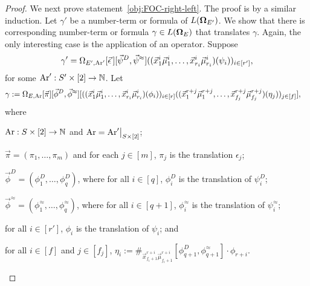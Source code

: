 \documentclass[../main/thesis.tex]{subfiles}
\begin{document}
\begin{proof}



  

  We next prove statement~\ref{obj:FOC-right-left}. The proof is by a similar
  induction. Let $\gamma'$ be a number-term or formula of $L(\mathbf{\mathbf{\Omega}}_{E'})$. We
  show that there is corresponding number-term or formula $\gamma \in
  L(\mathbf{\mathbf{\Omega}}_{E})$ that translates $\gamma$. Again, the only interesting case is
  the application of an operator. Suppose
  \begin{align*}
    \gamma' = \Omega_{E', \text{\upshape Ar}'}[\vec{\epsilon}\,][\vec{\psi}^D, \vec{\psi}^{\approx}] ((\vec{x}^i_1 \vec{\mu}^i_1, \ldots, \vec{x}^i_{r_i} \vec{\mu}^i_{r_i})(\psi_i))_{i \in [r']},
  \end{align*}
  for some $\text{\upshape Ar}' : S' \times [2] \rightarrow \mathbb{N}$. Let
  \begin{align*}
    \gamma := \Omega_{E, \text{\upshape Ar}} [\vec{\pi}] [\vec{\phi}^D, \vec{\phi}^{\approx}]  [((\vec{x}^i_1 \vec{\mu}^i_1, \ldots, \vec{x}^i_{r_i} \vec{\mu}^i_{r_i})(\phi_i))_{i \in [r]}&((\vec{x}^{r + j}_1 \vec{\mu}^{r + j}_1, \ldots, \vec{x}^{r + j}_{f_j} \vec{\mu}^{r+j}_{f_j})(\eta_j))_{j \in [f]}],
  \end{align*}
  where
  \begin{myitemize}
  \item $\text{\upshape Ar} : S \times [2] \rightarrow \mathbb{N}$ and $\ar = \restr{\ar'}{S \times [2]}$;
  \item $\vec{\pi} = (\pi_1, \ldots, \pi_m)$ and for each $j \in [m]$, $\pi_j$
    is the translation $\epsilon_j$;
  \item $\vec{\phi}^D = (\phi^D_1, \ldots, \phi^D_{q})$, where for all $i \in
    [q]$, $\phi^D_i$ is the translation of $\psi^D_i$;
  \item $\vec{\phi}^{\approx} = (\phi^{\approx}_1, \ldots, \phi^{\approx}_q)$,
    where for all $i \in [q+1]$, $\phi^{\approx}_i$ is the translation of
    $\psi^\approx_i$;
  \item for all $i \in [r']$, $\phi_i$ is the translation of $\psi_i$; and
  \item for all $i \in [f]$ and $j \in [f_j]$, $\eta_i := \#_{\vec{x}^{r +
        i}_{f_i + 1}\vec{\mu}^{r + i}_{f_i + 1}}[\phi^D_{q+1},
    \phi^\approx_{q+1}] \cdot \phi_{r+i}$.
  \end{myitemize}
  

\end{proof}
\end{document}
